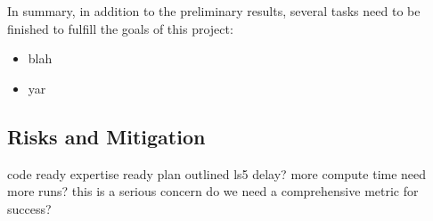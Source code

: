 %
%




In summary, in addition to the preliminary results, several tasks need
to be finished to fulfill the goals of this project:

\begin{itemize}
\item blah
\item yar
\end{itemize}

%
%
\subsection{Risks and Mitigation}

code ready
expertise ready
plan outlined
ls5 delay?
more compute time
need more runs? this is a serious concern
do we need a comprehensive metric for success?
